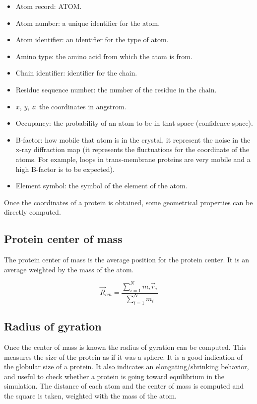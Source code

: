 \begin{multicols}{2}
	\begin{itemize}
		\item Atom record: ATOM.
		\item Atom number: a unique identifier for the atom.
		\item Atom identifier: an identifier for the type of atom.
		\item Amino type: the amino acid from which the atom is from.
		\item Chain identifier: identifier for the chain.
		\item Residue sequence number: the number of the residue in the chain.
		\item $x$, $y$, $z$: the coordinates in angstrom.
		\item Occupancy: the probability of an atom to be in that space (confidence space).
		\item B-factor: how mobile that atom is in the crystal, it represent the noise in the x-ray diffraction map (it represents the fluctuations for the coordinate of the atoms. For example, loops in trans-membrane proteins are very mobile and a high B-factor is to be expected).
		\item Element symbol: the symbol of the element of the atom.
	\end{itemize}
\end{multicols}

Once the coordinates of a protein is obtained, some geometrical properties can be directly computed.

	\subsection{Protein center of mass}
	The protein center of mass is the average position for the protein center.
	It is an average weighted by the mass of the atom.

	$$\vec{R}_{cm} = \frac{\sum\limits_{i=1}^Nm_i\vec{r}_i}{\sum\limits_{i=1}^Nm_i}$$

	\subsection{Radius of gyration}
	Once the center of mass is known the radius of gyration can be computed.
	This measures the size of the protein as if it was a sphere.
	It is a good indication of the globular size of a protein.
	It also indicates an elongating/shrinking behavior, and useful to check whether a protein is going toward equilibrium in the simulation.
	The distance of each atom and the center of mass is computed and the square is taken, weighted with the mass of the atom.

